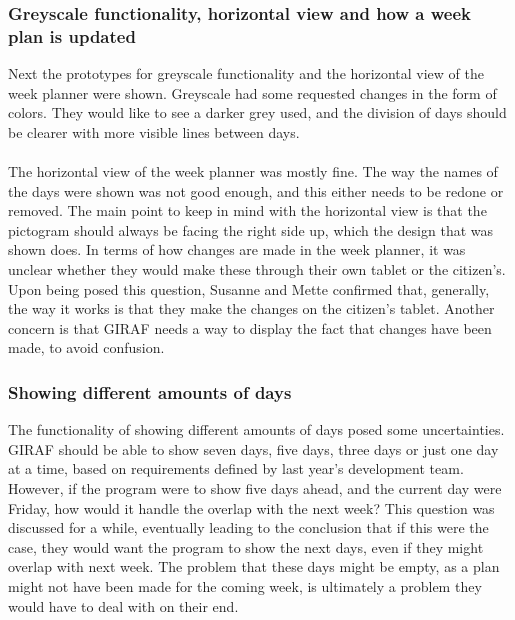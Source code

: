 \subsubsection{Greyscale functionality, horizontal view and how a week plan is updated}
Next the prototypes for greyscale functionality and the horizontal view of the week planner were shown.
Greyscale had some requested changes in the form of colors.
They would like to see a darker grey used, and the division of days should be clearer with more visible lines between days.
\\\\
The horizontal view of the week planner was mostly fine.
The way the names of the days were shown was not good enough, and this either needs to be redone or removed.
The main point to keep in mind with the horizontal view is that the pictogram should always be facing the right side up, which the design that was shown does.
In terms of how changes are made in the week planner, it was unclear whether they would make these through their own tablet or the citizen's.
Upon being posed this question, Susanne and Mette confirmed that, generally, the way it works is that they make the changes on the citizen's tablet.
Another concern is that GIRAF needs a way to display the fact that changes have been made, to avoid confusion.

\subsubsection{Showing different amounts of days}
The functionality of showing different amounts of days posed some uncertainties.
GIRAF should be able to show seven days, five days, three days or just one day at a time, based on requirements defined by last year's development team.
However, if the program were to show five days ahead, and the current day were Friday, how would it handle the overlap with the next week?
This question was discussed for a while, eventually leading to the conclusion that if this were the case, they would want the program to show the next days, even if they might overlap with next week.
The problem that these days might be empty, as a plan might not have been made for the coming week, is ultimately a problem they would have to deal with on their end.

